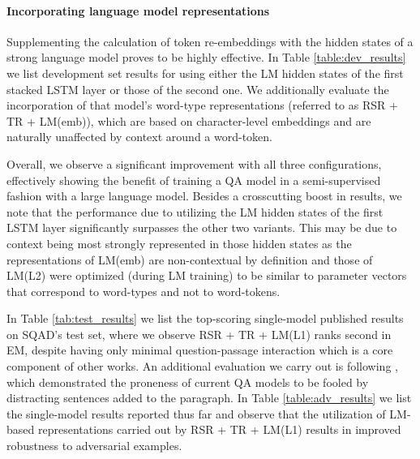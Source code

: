 \documentclass[11pt,a4paper]{article}
\newcommand{\squad}{\textsc{SQ\normalfont{u}AD}}
\newcommand{\lstm}{\textsc{LSTM}}
\newcommand{\rasor}{\textsc{R\normalfont{a}S\normalfont{o}R}}
\newcommand{\tr}{\textsc{TR}}
\newcommand{\rasorTrLstm}{\rasor{} + \tr{}}
\newcommand{\rasorTrLstmLm}{\rasorTrLstm{} + \textsc{LM}}
\newcommand{\rasorTrLstmLmEmb}{\rasorTrLstmLm(emb)}
\newcommand{\rasorTrLstmLmLi}{\rasorTrLstmLm\textsc{(L1)}}
\begin{document}
\paragraph{Incorporating language model representations}
Supplementing the calculation of token re-embeddings with the hidden states of a strong language model proves to be highly effective. In Table \ref{table:dev_results} we list development set results for using either the LM hidden states of the first stacked \lstm{} layer or those of the second one. We additionally evaluate the incorporation of that model's word-type representations (referred to as \rasorTrLstmLmEmb{}), which are based on character-level embeddings and are naturally unaffected by context around a word-token.

Overall, we observe a significant improvement with all three configurations, effectively showing the benefit of training a QA model in a semi-supervised fashion \cite{DBLP:conf/nips/DaiL15} with a large language model.
Besides a crosscutting boost in results, we note that the performance due to utilizing the LM hidden states of the first \lstm{} layer significantly surpasses the other two variants. This may be due to context being most strongly represented in those hidden states as the representations of LM(emb) are non-contextual by definition and those of LM(L2) were optimized (during LM training) to be similar to parameter vectors that correspond to word-types and not to word-tokens.

In Table \ref{tab:test_results} we list the top-scoring single-model published results on \squad{}'s test set, where we observe \rasorTrLstmLmLi{} ranks second in EM, despite having only minimal question-passage interaction which is a core component of other works.
An additional evaluation we carry out is following \citet{DBLP:conf/emnlp/JiaL17}, which demonstrated the proneness of current QA models to be fooled by distracting sentences added to the paragraph.
In Table \ref{table:adv_results} we list the single-model results reported thus far and observe that the utilization of LM-based representations carried out by \rasorTrLstmLmLi{} results in improved robustness to adversarial examples.
\end{document}
